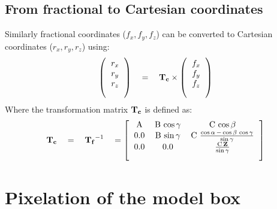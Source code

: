 \documentclass[9pt,tutorial]{livecoms}
\newcommand{\boxA}{\text{A}}
\newcommand{\boxB}{\text{B}}
\newcommand{\boxC}{\text{C}}
\newcommand{\Tc}{{\text{\bf{T}}_{\bf{c}}}}
\newcommand{\Tf}{{\text{\bf{T}}_{\bf{f}}}}
\begin{document}
\subsection{From fractional to Cartesian coordinates}
\noindent Similarly fractional coordinates ($f_x, f_y, f_z$) can be converted to Cartesian coordinates ($r_x, r_y, r_z$) using:
\begin{equation}
\left( \begin{blockarray}{c}
 r_x \\
 r_y \\
 r_z
\end{blockarray} \right)
\quad = \quad \Tc
\times
\left( \begin{blockarray}{c}
 f_x \\
 f_y \\
 f_z
\end{blockarray} \right)
\end{equation}
Where the transformation matrix $\Tc$ is defined as:
\begin{equation}
\Tc \quad = \quad \Tf^{-1} \quad =
\left[ \begin{blockarray}{ccc} 
 \boxA & \boxB \, \cos{\gamma} & \boxC \, \cos{\beta} \\
 0.0 & \boxB \, \sin{\gamma} & \boxC \ \frac{\cos{\alpha}\, -\, \cos{\beta} \, \cos{\gamma}}{\sin{\gamma}}  \\
 0.0 & 0.0 & \frac{\boxC \, {\bf{Z}}}{\sin{\gamma}}
\end{blockarray} \right] 
\end{equation}

\section{Pixelation of the model box}
\label{pixel}
\end{document}
